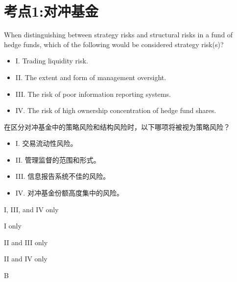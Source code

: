 \documentclass{article}
\newcounter{question} %
\begin{document}
 \tableofcontents %
\newpage




\section{考点1:对冲基金}
\setcounter{question}{0}

\begin{question}
    When distinguishing between strategy risks and structural risks in a fund of hedge funds, which of the following would be considered strategy risk(s)?  
    \begin{itemize}
        \item I. Trading liquidity risk.  
        \item II. The extent and form of management oversight.  
        \item III. The risk of poor information reporting systems.  
        \item IV. The risk of high ownership concentration of hedge fund shares.
    \end{itemize}
    在区分对冲基金中的策略风险和结构风险时，以下哪项将被视为策略风险？  
    \begin{itemize}
        \item I. 交易流动性风险。  
        \item II. 管理监督的范围和形式。  
        \item III. 信息报告系统不佳的风险。  
        \item IV. 对冲基金份额高度集中的风险。
    \end{itemize}
\end{question}

\begin{choices}
    \item I, III, and IV only
    \item I only
    \item II and III only
    \item II and IV only
\end{choices}

\begin{correctanswer}
    B
\end{correctanswer}
\end{document}
